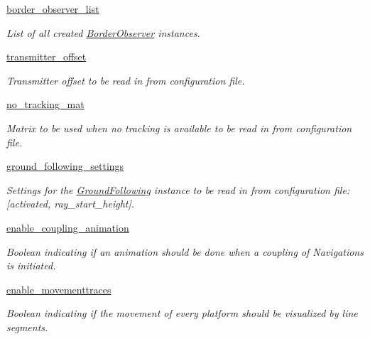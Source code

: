 \begin{DoxyCompactItemize}
\hyperlink{classlib_1_1ViewingManager_1_1ViewingManager_a82f545546333369a92690e85bfd66ba9}{border\-\_\-observer\-\_\-list}
\begin{DoxyCompactList}\small\item\em \-List of all created \hyperlink{namespacelib_1_1BorderObserver}{\-Border\-Observer} instances. \end{DoxyCompactList}\item 
\hyperlink{classlib_1_1ViewingManager_1_1ViewingManager_a57b0588cf1fc52e900e42d9c1e4e45a1}{transmitter\-\_\-offset}
\begin{DoxyCompactList}\small\item\em \-Transmitter offset to be read in from configuration file. \end{DoxyCompactList}\item 
\hyperlink{classlib_1_1ViewingManager_1_1ViewingManager_adff6ad35845fc81c5fbc66e3ac58ff38}{no\-\_\-tracking\-\_\-mat}
\begin{DoxyCompactList}\small\item\em \-Matrix to be used when no tracking is available to be read in from configuration file. \end{DoxyCompactList}\item 
\hyperlink{classlib_1_1ViewingManager_1_1ViewingManager_a3e7b032b2778307d75c9682142bc18a8}{ground\-\_\-following\-\_\-settings}
\begin{DoxyCompactList}\small\item\em \-Settings for the \hyperlink{namespacelib_1_1GroundFollowing}{\-Ground\-Following} instance to be read in from configuration file\-: \mbox{[}activated, ray\-\_\-start\-\_\-height\mbox{]}. \end{DoxyCompactList}\item 
\hyperlink{classlib_1_1ViewingManager_1_1ViewingManager_abe2b79e8a02cfbc1ad937ca88b0264fd}{enable\-\_\-coupling\-\_\-animation}
\begin{DoxyCompactList}\small\item\em \-Boolean indicating if an animation should be done when a coupling of \-Navigations is initiated. \end{DoxyCompactList}\item 
\hyperlink{classlib_1_1ViewingManager_1_1ViewingManager_a4cb197d27a7877a90051840114cfa3f4}{enable\-\_\-movementtraces}
\begin{DoxyCompactList}\small\item\em \-Boolean indicating if the movement of every platform should be visualized by line segments. \end{DoxyCompactList}\end{DoxyCompactItemize}
